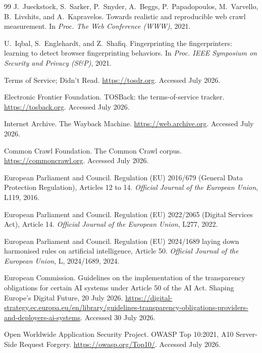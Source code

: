 \documentclass[11pt]{article}
\begin{document}
\begin{thebibliography}{99}
J.~Jueckstock, S.~Sarker, P.~Snyder, A.~Beggs, P.~Papadopoulos, M.~Varvello,
B.~Livshits, and A.~Kapravelos.
Towards realistic and reproducible web crawl measurement.
In \emph{Proc. The Web Conference (WWW)}, 2021.

U.~Iqbal, S.~Englehardt, and Z.~Shafiq.
Fingerprinting the fingerprinters: learning to detect browser fingerprinting
behaviors.
In \emph{Proc. IEEE Symposium on Security and Privacy (S\&P)}, 2021.

Terms of Service; Didn't Read.
\url{https://tosdr.org}. Accessed July 2026.

Electronic Frontier Foundation.
TOSBack: the terms-of-service tracker.
\url{https://tosback.org}. Accessed July 2026.

Internet Archive.
The Wayback Machine.
\url{https://web.archive.org}. Accessed July 2026.

Common Crawl Foundation.
The Common Crawl corpus.
\url{https://commoncrawl.org}. Accessed July 2026.

European Parliament and Council.
Regulation (EU) 2016/679 (General Data Protection Regulation), Articles 12 to 14.
\emph{Official Journal of the European Union}, L119, 2016.

European Parliament and Council.
Regulation (EU) 2022/2065 (Digital Services Act), Article 14.
\emph{Official Journal of the European Union}, L277, 2022.

European Parliament and Council.
Regulation (EU) 2024/1689 laying down harmonised rules on artificial
intelligence, Article 50.
\emph{Official Journal of the European Union}, L, 2024/1689, 2024.

European Commission.
Guidelines on the implementation of the transparency obligations for certain AI
systems under Article 50 of the AI Act.
Shaping Europe's Digital Future, 20 July 2026.
\url{https://digital-strategy.ec.europa.eu/en/library/guidelines-transparency-obligations-providers-and-deployers-ai-systems}.
Accessed 30 July 2026.

Open Worldwide Application Security Project.
OWASP Top 10:2021, A10 Server-Side Request Forgery.
\url{https://owasp.org/Top10/}. Accessed July 2026.

\end{thebibliography}
\end{document}
